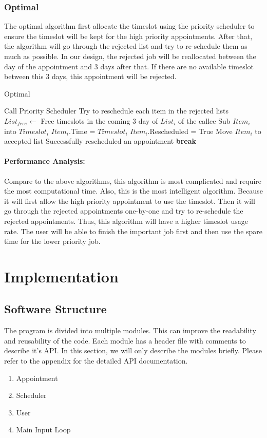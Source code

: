 \documentclass[12pt,a4paper]{report}
\newcommand{\In}{\textbf{in}\,}
\begin{document}
\subsection{Optimal}
The optimal algorithm first allocate the timeslot using the priority scheduler to ensure the timeslot will be kept for the high priority appointments. After that, the algorithm will go through the rejected list and try to re-schedule them as much as possible. In our design, the rejected job will be reallocated between the day of the appointment and 3 days after that. If there are no available timeslot between this 3 days, this appointment will be rejected.
\begin{algorithm}
\caption{Optimal}\label{Psudo:Opti}
\begin{algorithmic}
\State Call Priority Scheduler
\LineComment Try to reschedule each item in the rejected lists
  \State $List_{free} \gets$ Free timeslots in the coming 3 day of $List_i$ of the callee
  \For {\textbf{each} $Timeslot_i$ \In $List_{free}$}
    \State Sub $Item_i$ into $Timeslot_i$
      \State $Item_i$.Time = $Timeslot_i$
      \State $Item_i$.Rescheduled = True
      \State Move $Item_i$ to accepted list \Comment Successfully rescheduled an appointment
      \State \textbf{break}
    \EndIf
  \EndFor
\EndFor
\end{algorithmic}
\end{algorithm}
\subsubsection{Performance Analysis:}
Compare to the above algorithms, this algorithm is most complicated and require the most computational time. Also, this is the most intelligent algorithm. Because it will first allow the high priority appointment to use the timeslot. Then it will go through the rejected appointments one-by-one and try to re-schedule the rejected appointments. Thus, this algorithm will have a higher timeslot usage rate. The user will be able to finish the important job first and then use the spare time for the lower priority job.
\chapter{Implementation}
\section{Software Structure}
The program is divided into multiple modules. This can improve the readability and reusability of the code. Each module has a header file with comments to describe it's API. In this section, we will only describe the modules briefly. Please refer to the appendix for the detailed API documentation.
\begin{enumerate}
\item Appointment
\item Scheduler
\item User
\item Main Input Loop
\end{enumerate}
\end{document}
